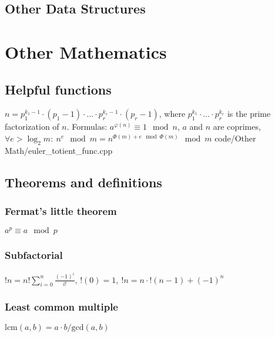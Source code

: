 \documentclass[
	a4paper,
	landscape,
	10pt,
]{article}
\begin{document}
\subsection{Other Data Structures}

\section{Other Mathematics}
	\subsection{Helpful functions}
		{
			$n = p_1^{k_1-1}\cdot(p_1-1) \cdot \hdots \cdot p_r^{k_r-1}\cdot(p_r-1)$, where $p_1^{k_1} \cdot \hdots \cdot p_r^{k_r}$ is the prime factorization of $n$.
			Formulas: $a^{\varphi (n)} \equiv 1 \mod n$, $a$ and $n$ are coprimes, $\forall e > \log_2 m:~ n^e \mod m = n^{\Phi(m) + e \mod \Phi(m)} \mod m$
		}
		{code/Other Math/euler_totient_func.cpp}

	\subsection{Theorems and definitions}
		\subsubsection{Fermat's little theorem}
		$a^p \equiv a \mod p$
		\subsubsection{Subfactorial}
		$!n = n! \sum_{i=0}^{n} \frac{(-1)^i}{i!}$, 
		$!(0) = 1, ~ !n = n \cdot !(n-1) + (-1)^n$
		\subsubsection{Least common multiple}
		$\text{lcm}(a, b) = a \cdot b / \text{gcd}(a, b)$
\end{document}
